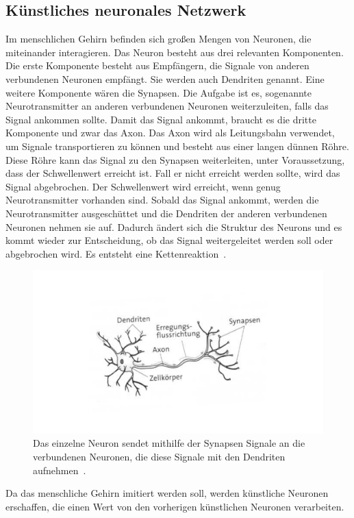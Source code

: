 \documentclass[11pt]{article}
\begin{document}
\subsection{Künstliches neuronales Netzwerk}\label{nn} %
Im menschlichen Gehirn befinden sich großen Mengen von Neuronen, die miteinander interagieren. 
Das Neuron besteht aus drei relevanten Komponenten. Die erste Komponente besteht aus Empfängern, die Signale von anderen verbundenen Neuronen empfängt.
Sie werden auch Dendriten genannt. Eine weitere Komponente wären die Synapsen. Die Aufgabe ist es, sogenannte Neurotransmitter an anderen verbundenen Neuronen
weiterzuleiten, falls das Signal ankommen sollte. Damit das Signal ankommt, braucht es die dritte Komponente und zwar das Axon. Das Axon wird als Leitungsbahn
verwendet, um Signale transportieren zu können und besteht aus einer langen dünnen Röhre. Diese Röhre kann das Signal zu den Synapsen weiterleiten, unter Voraussetzung, dass der Schwellenwert erreicht ist.
Fall er nicht erreicht werden sollte, wird das Signal abgebrochen. Der Schwellenwert wird erreicht, wenn genug Neurotransmitter vorhanden sind.
Sobald das Signal ankommt, werden die Neurotransmitter
ausgeschüttet und die Dendriten der anderen verbundenen Neuronen nehmen sie auf.
Dadurch ändert sich die Struktur des Neurons und es kommt wieder zur Entscheidung, ob das Signal weitergeleitet werden soll oder abgebrochen wird.
Es entsteht eine Kettenreaktion~\cite{11}.
\begin{figure}[h]
    \centering
    \includegraphics[width=350pt, keepaspectratio]{images/neuron}
    \caption[Aufbau eines Neuron~\cite{11}]{Das einzelne Neuron sendet mithilfe der Synapsen Signale an die verbundenen Neuronen, die diese Signale mit den Dendriten aufnehmen~\cite{11}.}
\end{figure}
Da das menschliche Gehirn imitiert werden soll, werden künstliche Neuronen erschaffen, die einen Wert von den vorherigen künstlichen Neuronen verarbeiten.
\end{document}
